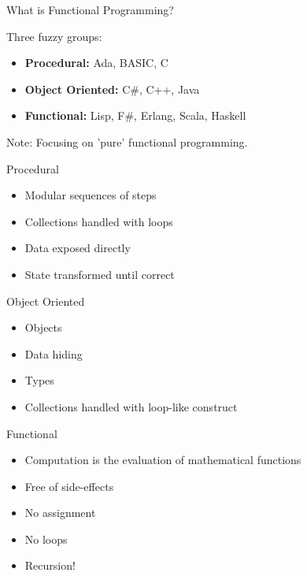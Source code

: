 \begin{frame}
  What is Functional Programming?
\end{frame}

\begin{frame}
  Three fuzzy groups:

  \begin{itemize}
    \item<1-> \textbf{Procedural:}      Ada, BASIC, C
    \item<2-> \textbf{Object Oriented:} C\#, C++, Java
    \item<3-> \textbf{Functional:}      Lisp, F\#, Erlang, Scala, Haskell
  \end{itemize}

  \pause
  \pause
  \pause

  Note: Focusing on 'pure' functional programming.
\end{frame}

\begin{frame}
  Procedural

  \begin{itemize}
    \item<1-> Modular sequences of steps
    \item<2-> Collections handled with loops
    \item<3-> Data exposed directly
    \item<4-> State transformed until correct
  \end{itemize}
\end{frame}

\begin{frame}[fragile]
  
\end{frame}

\begin{frame}
  Object Oriented

  \begin{itemize}
    \item<1-> Objects
    \item<2-> Data hiding
    \item<3-> Types
    \item<4-> Collections handled with loop-like construct
  \end{itemize}
\end{frame}

\begin{frame}[fragile]
  
\end{frame}

\begin{frame}
  Functional

  \begin{itemize}
    \item<1-> Computation is the evaluation of mathematical functions
    \item<2-> Free of side-effects
    \item<3-> No assignment
    \item<4-> No loops %
    \item<5-> Recursion!
  \end{itemize}
\end{frame}

